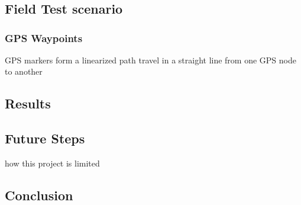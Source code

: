 \chapter{}

\section{Field Test scenario}

\subsection{GPS Waypoints}
GPS markers form a linearized path
travel in a straight line from one GPS node to another

\section{Results}

\section{Future Steps}
how this project is limited


\section{Conclusion}